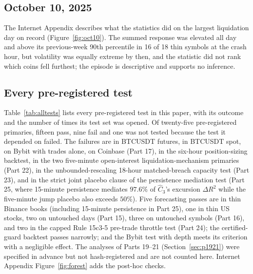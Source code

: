 \documentclass[12pt]{article}
\theoremstyle{definition}
\theoremstyle{remark}
\begin{document}
\subsection{October 10, 2025}\label{sec:oct10}
The Internet Appendix describes what the statistics did on the largest liquidation day on record (Figure~\ref{fig:oct10}). The summed response was elevated all day and above its previous-week 90th percentile in 16 of 18 thin symbols at the crash hour, but volatility was equally extreme by then, and the statistic did not rank which coins fell furthest; the episode is descriptive and supports no inference.

\subsection{Every pre-registered test}\label{sec:alltests}
Table~\ref{tab:alltests} lists every pre-registered test in this paper, with its outcome and the number of times its test set was opened. Of twenty-five pre-registered primaries, fifteen pass, nine fail and one was not tested because the test it depended on failed. The failures are in BTCUSDT futures, in BTCUSDT spot, on Bybit with trades alone, on Coinbase (Part 17), in the six-hour position-sizing backtest, in the two five-minute open-interest liquidation-mechanism primaries (Part 22), in the unbounded-rescaling 18-hour matched-breach capacity test (Part 23), and in the strict joint placebo clause of the persistence mediation test (Part 25, where 15-minute persistence mediates $97.6\%$ of $\hat C_3$'s excursion $\Delta R^2$ while the five-minute jump placebo also exceeds $50\%$). Five forecasting passes are in thin Binance books (including 15-minute persistence in Part 25), one in thin US stocks, two on untouched days (Part 15), three on untouched symbols (Part 16), and two in the capped Rule 15c3-5 pre-trade throttle test (Part 24); the certified-guard backtest passes narrowly; and the Bybit test with depth meets its criterion with a negligible effect. The analyses of Parts 19--21 (Section~\ref{sec:p1921}) were specified in advance but not hash-registered and are not counted here. Internet Appendix Figure~\ref{fig:forest} adds the post-hoc checks.
\end{document}
